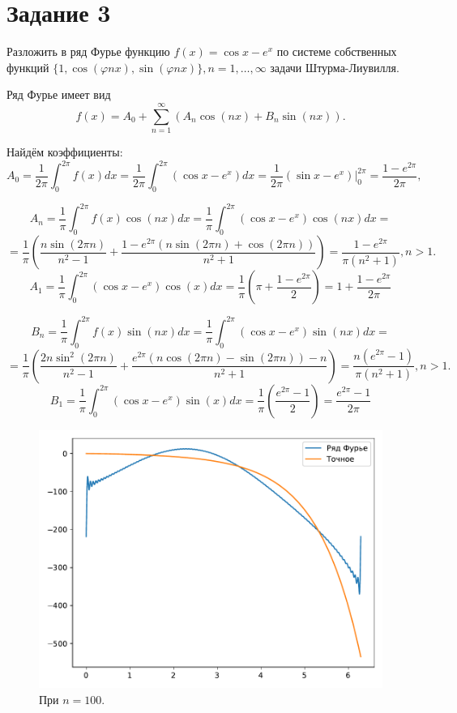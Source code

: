 \section*{Задание 3}
    Разложить в ряд Фурье функцию \( f(x) = \cos x - e^x \) по системе собственных функций \( \{ 1, \cos(\varphi n x), \sin(\varphi n x) \}, n = 1,\dots,\infty \) задачи Штурма-Лиувилля.

    Ряд Фурье имеет вид 
    \[
        f(x) = A_0 + \sum_{n=1}^{\infty} \left( A_n \cos(nx) + B_n \sin(nx) \right).
    \]

    Найдём коэффициенты:
    \[
        A_0 = \frac{1}{2\pi} \int_{0}^{2\pi} f(x) dx = \frac{1}{2\pi} \int_{0}^{2\pi} \left( \cos x - e^x \right) dx = \frac{1}{2\pi} \left( \sin x - e^x \right) \big|_0^{2\pi} = \frac{1 - e^{2\pi}}{2\pi},
    \]

    \[
        A_n = \frac{1}{\pi} \int_{0}^{2\pi} f(x) \cos(nx) dx = \frac{1}{\pi} \int_{0}^{2\pi} \left( \cos x - e^x \right) \cos(nx) dx =
    \]
    \[
        = \frac{1}{\pi} \left( \frac{n \sin(2\pi n)}{n^2 - 1} + \frac{1 - e^{2\pi} \left( n \sin(2\pi n) + \cos(2\pi n)\right)}{n^2+1}\right) = \frac{1 - e^{2\pi}}{\pi (n^2 + 1)}, n > 1.
    \]
    \[
        A_1 = \frac{1}{\pi} \int_{0}^{2\pi} \left( \cos x - e^x \right) \cos(x) dx = \frac{1}{\pi} \left( \pi + \frac{1 - e^{2\pi}}{2} \right)= 1 + \frac{1 - e^{2\pi}}{2\pi}
    \]

    \[
        B_n = \frac{1}{\pi} \int_{0}^{2\pi} f(x) \sin(nx) dx = \frac{1}{\pi} \int_{0}^{2\pi} \left( \cos x - e^x \right) \sin(nx) dx =
    \]
    \[
        = \frac{1}{\pi} \left( \frac{2n \sin^2(2\pi n)}{n^2 - 1} + \frac{e^{2\pi} \left(n \cos(2\pi n) - \sin(2\pi n)\right) - n}{n^2+1}\right) = \frac{n\left(e^{2\pi} - 1\right)}{\pi (n^2 + 1)}, n > 1.
    \]
    \[
        B_1 = \frac{1}{\pi} \int_{0}^{2\pi} \left( \cos x - e^x \right) \sin(x) dx = \frac{1}{\pi} \left( \frac{e^{2\pi} - 1}{2} \right) = \frac{e^{2\pi} - 1}{2\pi}
    \]

    \begin{figure}[H]
        \centering
        \includegraphics[width=14cm]{fur1.pdf}
        \caption{При \( n = 100 \).}
    \end{figure}

